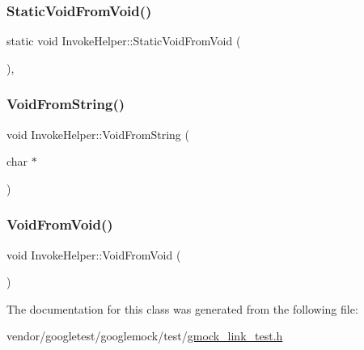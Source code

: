 \mbox{\label{class_invoke_helper_ae96b5bd7c4fa328d0a87bc986f135fe8}} 
\subsubsection{\texorpdfstring{Static\+Void\+From\+Void()}{StaticVoidFromVoid()}}
{\footnotesize\ttfamily static void Invoke\+Helper\+::\+Static\+Void\+From\+Void (\begin{DoxyParamCaption}{ }\end{DoxyParamCaption})\hspace{0.3cm}{\ttfamily [inline]}, {\ttfamily [static]}}

\mbox{\label{class_invoke_helper_a89f02dc384e6b5a7d935b7ea0a81cc9e}} 
\subsubsection{\texorpdfstring{Void\+From\+String()}{VoidFromString()}}
{\footnotesize\ttfamily void Invoke\+Helper\+::\+Void\+From\+String (\begin{DoxyParamCaption}\item[{char $\ast$}]{ }\end{DoxyParamCaption})\hspace{0.3cm}{\ttfamily [inline]}}

\mbox{\label{class_invoke_helper_a6371bcb64a8f01093f6fdef60776a031}} 
\subsubsection{\texorpdfstring{Void\+From\+Void()}{VoidFromVoid()}}
{\footnotesize\ttfamily void Invoke\+Helper\+::\+Void\+From\+Void (\begin{DoxyParamCaption}{ }\end{DoxyParamCaption})\hspace{0.3cm}{\ttfamily [inline]}}



The documentation for this class was generated from the following file\+:\begin{DoxyCompactItemize}
\item 
vendor/googletest/googlemock/test/\hyperlink{gmock__link__test_8h}{gmock\+\_\+link\+\_\+test.\+h}\end{DoxyCompactItemize}
